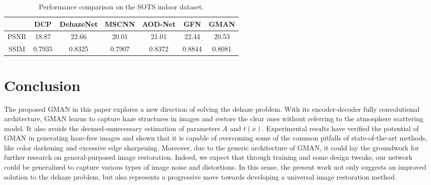 \documentclass[journal]{IEEEtran}
\begin{document}
\begin{table}[!htbp]
	\centering
	\caption{Performance comparison on the SOTS indoor dataset.}
	\begin{tabular}{ccccccc}
	\hline
		&DCP &DehazeNet &MSCNN &AOD-Net &GFN &GMAN\\ \hline
		PSNR &18.87 &22.66 &20.01 &21.01 &22.44 &20.53\\
		SSIM &0.7935 &0.8325 &0.7907 &0.8372 &0.8844 &0.8081\\ \hline
	\end{tabular}
	\label{t.2}
\end{table}













\section{Conclusion}
The proposed GMAN in this paper explores a new direction of solving the dehaze problem. With its encoder-decoder fully convolutional architecture, GMAN learns to capture haze structures in images and restore the clear ones without referring to the atmosphere scattering model. It also avoids the deemed-unnecessary estimation of parameters $A$ and $t(x)$. Experimental results have verified the potential of GMAN in generating haze-free images and shown that it is capable of overcoming some of the common pitfalls of state-of-the-art  methods, like color darkening and excessive edge sharpening. Moreover, due to the generic architecture of GMAN, it could lay the groundwork for further research on general-purposed image restoration. Indeed, we expect that through training and some design tweaks, our network could be generalized to capture various types of image noise and distortions. In this sense, the present work not only suggests an improved solution to the dehaze problem, but also represents a progressive move towards developing a universal image restoration method.








\appendices





\ifCLASSOPTIONcaptionsoff
  \newpage
\fi








\end{document}
